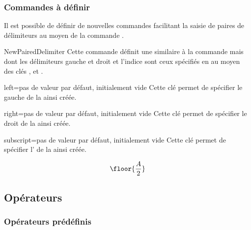 \documentclass[french,nolocaltoc]{nwejmart}
\newtheorem[style=definition]{fait}
\newtheorem[title=expérience]{experience}
\newtheorem[title-plural=anneaux]{anneau}
\newtheorem[title=idéal,title-plural=idéaux]{ideal}
\begin{document}
\subsubsection{Commandes à définir}

Il est possible de définir de nouvelles commandes facilitant la saisie de paires
de délimiteurs au moyen de la commande .
%
\begin{docCommand}{NewPairedDelimiter}{}
  Cette commande définit une  similaire à la commande
   mais dont les délimiteurs gauche et droit et l'indice
  sont ceux spécifiés en  au moyen des clés ,
   et .
  \begin{docKey}{left}{=}{pas de valeur par défaut,
      initialement vide}
    Cette clé permet de spécifier le  gauche de la  ainsi
    créée.
  \end{docKey}
  \begin{docKey}{right}{=}{pas de valeur par défaut,
      initialement vide}
    Cette clé permet de spécifier le  droit de la
     ainsi créée.
  \end{docKey}
  \begin{docKey}{subscript}{=}{pas de valeur par défaut,
      initialement vide}
    Cette clé permet de spécifier l' de la  ainsi
    créée.
  \end{docKey}
\end{docCommand}

\begin{preamblecode}[listing options={morekeywords={[2]left,right,subscript}}]
\end{preamblecode}
\begin{bodycode}
\begin{equation}
\floor{\frac{A}{2}}
\end{equation}
\end{bodycode}

\subsection{Opérateurs}

\subsubsection{Opérateurs prédéfinis}
\end{document}
